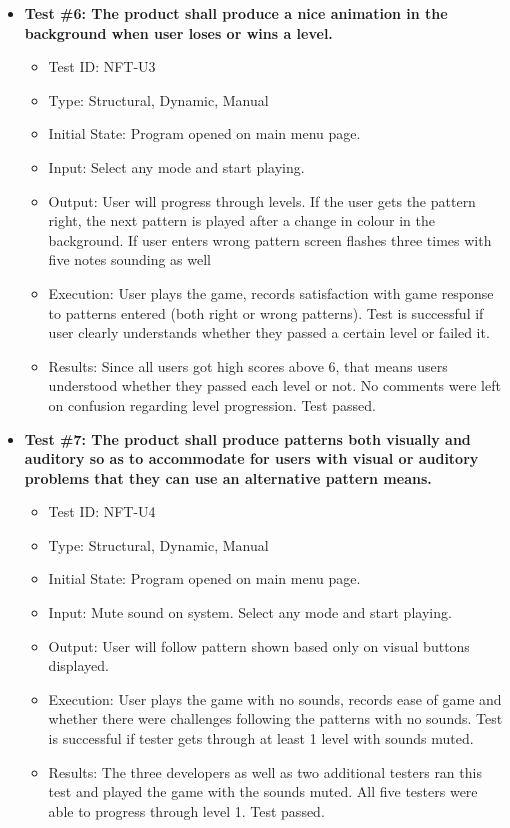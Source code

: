\documentclass[12pt, titlepage]{article}
\begin{document}
\begin{itemize}
\item \textbf{Test \#6: The product shall produce a nice animation in the background when user loses or wins a level.}
\begin{itemize}
\item Test ID: NFT-U3
\item Type: Structural, Dynamic, Manual				
\item Initial State: Program opened on main menu page.		
\item Input: Select any mode and start playing.
\item Output: User will progress through levels. If the user gets the pattern right, the next pattern is played after a change in colour in the background. If user enters wrong pattern screen flashes three times with five notes sounding as well
\item Execution: User plays the game, records satisfaction with game response to patterns entered (both right or wrong patterns). Test is successful if user clearly understands whether they passed a certain level or failed it.
\item Results: Since all users got high scores above 6, that means users understood whether they passed each level or not. No comments were left on confusion regarding level progression. Test passed.
\end{itemize}

\item \textbf{Test \#7: The product shall produce patterns both visually and auditory so as to accommodate for users with visual or auditory problems that they can use an alternative pattern means.}
\begin{itemize}
\item Test ID: NFT-U4
\item Type: Structural, Dynamic, Manual				
\item Initial State: Program opened on main menu page.		
\item Input: Mute sound on system. Select any mode and start playing.
\item Output: User will follow pattern shown based only on visual buttons displayed.
\item Execution: User plays the game with no sounds, records ease of game and whether there were challenges following the patterns with no sounds. Test is successful if tester gets through at least 1 level with sounds muted.
\item Results: The three developers as well as two additional testers ran this test and played the game with the sounds muted. All five testers were able to progress through level 1. Test passed.
\end{itemize}
\end{itemize}
\end{document}
